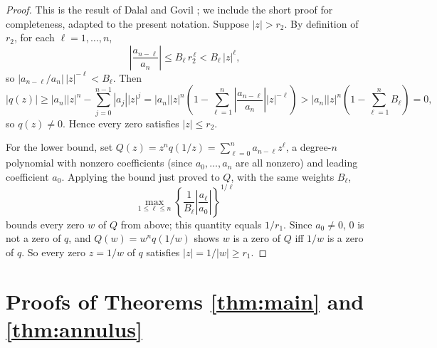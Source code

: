 \documentclass[11pt,a4paper]{article}
\numberwithin{equation}{section}
\numberwithin{table}{section}
\numberwithin{figure}{section}
\begin{document}
\begin{proof}
	This is the result of Dalal and Govil \cite{dalalgovil}; we include the short proof for completeness, adapted to the present notation. Suppose $|z|>r_2$. By definition of $r_2$, for each $\ell=1,\dots,n$,
	\[
	\left|\frac{a_{n-\ell}}{a_n}\right|\le B_\ell\, r_2^{\,\ell} < B_\ell\,|z|^{\ell},
	\]
	so $|a_{n-\ell}/a_n|\,|z|^{-\ell}<B_\ell$. Then
	\[
	|q(z)|\ge|a_n||z|^n-\sum_{j=0}^{n-1}|a_j||z|^j
	=|a_n||z|^n\left(1-\sum_{\ell=1}^n\left|\frac{a_{n-\ell}}{a_n}\right||z|^{-\ell}\right)
	>|a_n||z|^n\left(1-\sum_{\ell=1}^nB_\ell\right)=0,
	\]
	so $q(z)\neq0$. Hence every zero satisfies $|z|\le r_2$.
	
	For the lower bound, set $Q(z)=z^nq(1/z)=\sum_{\ell=0}^na_{n-\ell}z^\ell$, a degree-$n$ polynomial with nonzero coefficients (since $a_0,\dots,a_n$ are all nonzero) and leading coefficient $a_0$. Applying the bound just proved to $Q$, with the same weights $B_\ell$,
	\[
	\max_{1\le\ell\le n}\left\{\frac1{B_\ell}\left|\frac{a_\ell}{a_0}\right|\right\}^{1/\ell}
	\]
	bounds every zero $w$ of $Q$ from above; this quantity equals $1/r_1$. Since $a_0\neq0$, $0$ is not a zero of $q$, and $Q(w)=w^nq(1/w)$ shows $w$ is a zero of $Q$ iff $1/w$ is a zero of $q$. So every zero $z=1/w$ of $q$ satisfies $|z|=1/|w|\ge r_1$.
\end{proof}
	
\section{Proofs of Theorems \ref{thm:main} and \ref{thm:annulus}}
\end{document}
